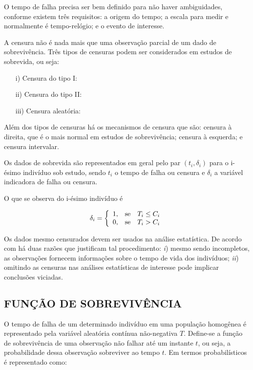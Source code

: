 O tempo de falha precisa ser bem definido para não haver ambiguidades, conforme  existem três requisitos: a origem do tempo; a escala para medir e normalmente é tempo-relógio; e o evento de interesse.	

A censura não é nada mais que uma observação parcial de um dado de sobrevivência. Três tipos de censuras podem ser considerados em estudos de sobrevida, ou seja:

\begin{itemize}
	\item [i)] Censura do tipo I:
	\item [ii)] Censura do tipo II:
	\item [iii)] Censura aleatória:
\end{itemize}

Além dos tipos de censuras há os mecanismos de censura que são: censura à direita, que é o mais normal em estudos de sobrevivência; censura à esquerda; e censura intervalar.

Os dados de sobrevida são representados em geral pelo par $(t_i,\delta_i)$ para o i-ésimo indivíduo sob estudo, sendo $t_i$ o tempo de falha ou censura e $\delta_i$ a variável indicadora de falha ou censura. 

O que se observa do i-ésimo indivíduo é

\begin{equation*}
\delta_i
= \left\{\begin{array}{rll}
1, & \hbox{se} & T_i \leq C_i \\
0, & \hbox{se} & T_i > C_i
\end{array}\right.
\end{equation*}


Os dados mesmo censurados devem ser usados na análise estatística. De acordo com  há duas razões que justificam tal procedimento: \textit{i}) mesmo sendo incompletos, as observações fornecem informações sobre o tempo de vida dos indivíduos; \textit{ii}) omitindo as censuras nas análises estatísticas de interesse pode implicar conclusões viciadas.


		 \subsection{FUNÇÃO DE SOBREVIVÊNCIA}

O tempo de falha de um determinado indivíduo em uma população homogênea é representado pela variável aleatória contínua não-negativa $T$. Define-se a função de sobrevivência de uma observação não falhar até um instante $t$, ou seja, a probabilidade dessa observação sobreviver ao tempo $t$. Em termos probabilísticos é representado como:

